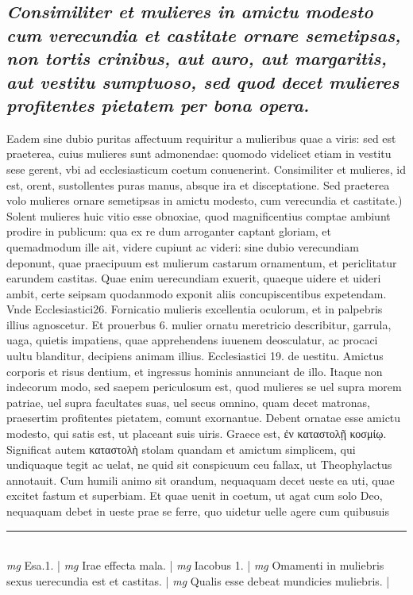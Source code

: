 \documentclass{article}
\begin{document}
\begin{pages}
\subsection*{\textit{Consimiliter et mulieres in amictu modesto cum verecundia et castitate ornare semetipsas, non tortis crinibus, aut auro, aut margaritis, aut vestitu sumptuoso, sed quod decet mulieres profitentes pietatem per bona opera. }}\pstart Eadem sine dubio puritas affectuum requiritur a mulieribus quae a viris: sed est praeterea, cuius mulieres sunt admonendae: quomodo videlicet etiam in vestitu sese gerent, vbi ad ecclesiasticum coetum conuenerint. Consimiliter et mulieres, id est, orent, sustollentes puras manus, absque  ira et disceptatione.  \pend\pstart Sed praeterea volo mulieres ornare semetipsas in amictu modesto, cum verecundia et castitate.) Solent mulieres huic vitio esse obnoxiae, quod magnificentius comptae ambiunt prodire in publicum: qua ex re dum arroganter captant gloriam, et quemadmodum ille ait, videre cupiunt ac videri: sine dubio verecundiam deponunt, quae praecipuum est mulierum castarum ornamentum, et periclitatur earundem castitas. Quae enim uerecundiam exuerit, quaeque  uidere et uideri ambit, certe seipsam quodanmodo exponit aliis concupiscentibus expetendam. Vnde Ecclesiastici26. Fornicatio mulieris excellentia oculorum, et in palpebris illius agnoscetur. Et prouerbus 6. mulier ornatu meretricio describitur, garrula, uaga, quietis impatiens, quae apprehendens iuuenem deosculatur, ac procaci uultu blanditur, decipiens animam illius. Ecclesiastici 19. de uestitu. Amictus corporis et risus dentium, et ingressus hominis annunciant de illo. Itaque  non indecorum modo, sed saepem periculosum est, quod mulieres se uel supra morem patriae, uel supra facultates suas, uel secus omnino, quam decet matronas, praesertim profitentes pietatem, comunt exornantue. Debent ornatae esse amictu modesto, qui satis est, ut placeant suis uiris. Graece est, ἐν καταστολῇ κοσμίῳ. Significat autem καταστολὴ stolam quandam et amictum simplicem, qui undiquaque tegit ac uelat, ne quid sit conspicuum ceu fallax, ut Theophylactus annotauit. Cum humili animo sit orandum, nequaquam decet ueste ea uti, quae excitet fastum et superbiam. Et quae uenit in coetum, ut agat cum solo Deo, nequaquam debet in ueste prae se ferre, quo uidetur uelle agere cum quibusuis  \pend
\vspace{0.5cm}\noindent
\vspace{0.2cm}\rule{1cm}{0.2pt}\\ 
\hspace{0.2cm}\textit{mg}
\footnotesize Esa.1. 
\normalsize| 
\hspace{0.2cm}\textit{mg}
\footnotesize Irae effecta mala. 
\normalsize| 
\hspace{0.2cm}\textit{mg}
\footnotesize Iacobus 1. 
\normalsize| 
\hspace{0.2cm}\textit{mg}
\footnotesize Omamenti in muliebris sexus uerecundia est et castitas. 
\normalsize| 
\hspace{0.2cm}\textit{mg}
\footnotesize Qualis esse debeat mundicies muliebris. 
\normalsize| 

\end{pages}
\end{document}
